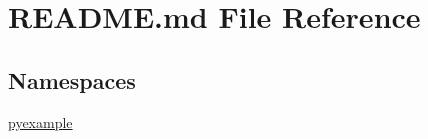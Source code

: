 \hypertarget{_r_e_a_d_m_e_8md}{}\section{R\+E\+A\+D\+M\+E.\+md File Reference}
\label{_r_e_a_d_m_e_8md}
\subsection*{Namespaces}
\begin{DoxyCompactItemize}
\item 
 \mbox{\hyperlink{namespacepyexample}{pyexample}}
\end{DoxyCompactItemize}
